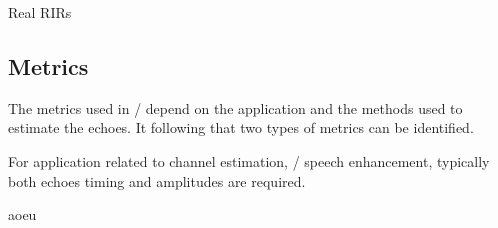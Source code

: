 Real RIRs

\subsection{Metrics}
The metrics used in \AER/ depend on the application and the methods used to estimate the echoes.
It following that two types of metrics can be identified.

For application related to channel estimation, \eg/ speech enhancement, typically both echoes timing and amplitudes are required.

aoeu







